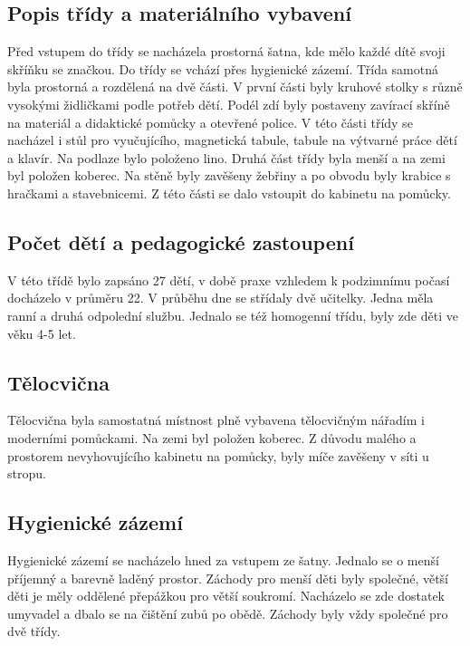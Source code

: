 
		\subsection{Popis třídy a materiálního vybavení}

			Před vstupem do třídy se nacházela prostorná šatna, kde mělo každé dítě svoji skříňku se značkou. Do třídy se vchází přes hygienické zázemí. Třída samotná byla prostorná a rozdělená na dvě části. V první části byly kruhové stolky s různě vysokými židličkami podle potřeb dětí. Podél zdí byly postaveny zavírací skříně na materiál a didaktické pomůcky a otevřené police. V této části třídy se nacházel i stůl pro vyučujícího, magnetická tabule, tabule na výtvarné práce dětí a klavír. Na podlaze bylo položeno lino. Druhá část třídy byla menší a na zemi byl položen koberec. Na stěně byly zavěšeny žebřiny a po obvodu byly krabice s hračkami a stavebnicemi. Z této části se dalo vstoupit do kabinetu na pomůcky.

		\subsection{Počet dětí a pedagogické zastoupení}

			V této třídě bylo zapsáno 27 dětí, v době praxe vzhledem k podzimnímu počasí docházelo v průměru 22. V průběhu dne se střídaly dvě učitelky. Jedna měla ranní a druhá odpolední službu.
			Jednalo se též  homogenní třídu, byly zde děti ve věku 4-5 let.
		
		\subsection{Tělocvična}
			Tělocvična byla samostatná místnost plně vybavena tělocvičným nářadím i moderními pomůckami. Na zemi byl položen koberec. Z důvodu malého a prostorem nevyhovujícího kabinetu na pomůcky,  byly míče zavěšeny v síti u stropu.

		\subsection{Hygienické zázemí}
			Hygienické zázemí se nacházelo hned za vstupem ze šatny. Jednalo se o menší příjemný a barevně laděný prostor. Záchody pro menší děti byly společné, větší děti je měly oddělené přepážkou pro větší soukromí. Nacházelo se zde dostatek umyvadel a dbalo se na čištění zubů po obědě. Záchody byly vždy společné pro dvě třídy. 

